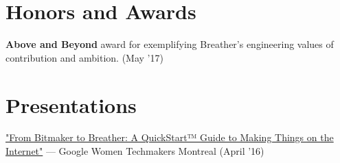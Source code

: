 \documentclass[letterpaper,10.8pt]{article}
\begin{document}
\section{Honors and Awards}
\begin{description}[font=$\bullet$]
\item {\textbf{Above and Beyond} award for exemplifying Breather’s engineering values of contribution and ambition. (May '17)}
\vspace{-2px}
\end{description}

\section{Presentations}
\begin{description}[font=$\bullet$]
\item {\href{https://www.youtube.com/watch?v=6EHbfAmA_0c}{"From Bitmaker to Breather: A QuickStart™ Guide to Making Things on the Internet"} — Google Women Techmakers Montreal (April '16)}
\end{description}

\end{document}
